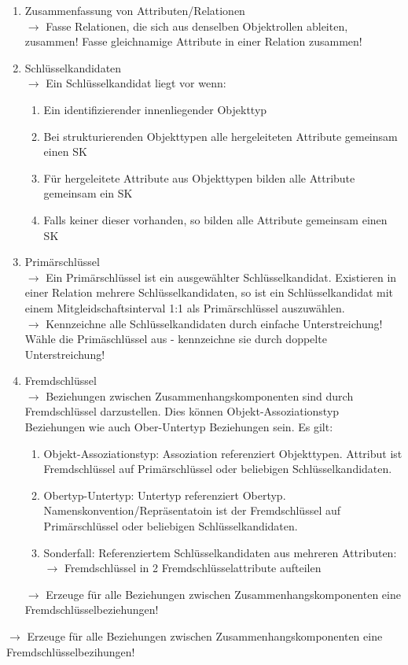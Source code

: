 \documentclass[a4paper,10pt]{scrartcl}
\begin{document}
\begin{enumerate}
    \item Zusammenfassung von Attributen/Relationen \\
    $\rightarrow$ Fasse Relationen, die sich aus denselben Objektrollen ableiten, zusammen! Fasse gleichnamige Attribute in einer Relation zusammen!
    
    \item Schlüsselkandidaten\\
    $\rightarrow$ Ein Schlüsselkandidat liegt vor wenn:
    \begin{enumerate}
        \item Ein identifizierender innenliegender Objekttyp
        \item Bei strukturierenden Objekttypen alle hergeleiteten Attribute gemeinsam einen SK
        \item Für hergeleitete Attribute aus Objekttypen bilden alle Attribute gemeinsam ein SK
        \item Falls keiner dieser vorhanden, so bilden alle Attribute gemeinsam einen SK
    \end{enumerate} 
    
    \item Primärschlüssel \\
    $\rightarrow$ 
    Ein Primärschlüssel ist ein ausgewählter Schlüsselkandidat. Existieren in einer Relation mehrere Schlüsselkandidaten, so ist ein Schlüsselkandidat mit einem Mitgleidschaftsinterval 1:1 als Primärschlüssel auszuwählen. \\
    $\rightarrow$ 
    Kennzeichne alle Schlüsselkandidaten durch einfache Unterstreichung! Wähle die Primäschlüssel aus - kennzeichne sie durch doppelte Unterstreichung!
    
    \item Fremdschlüssel \\
    $\rightarrow$ Beziehungen zwischen Zusammenhangskomponenten sind durch Fremdschlüssel darzustellen. Dies können Objekt-Assoziationstyp Beziehungen wie auch Ober-Untertyp Beziehungen sein. Es gilt:
    \begin{enumerate}
        \item Objekt-Assoziationstyp: Assoziation referenziert Objekttypen. Attribut ist Fremdschlüssel auf Primärschlüssel oder beliebigen Schlüsselkandidaten.
        \item Obertyp-Untertyp: Untertyp referenziert Obertyp. Namenskonvention/Repräsentatoin ist der Fremdschlüssel auf Primärschlüssel oder beliebigen Schlüsselkandidaten.
        \item Sonderfall: Referenziertem Schlüsselkandidaten aus mehreren Attributen:
        $\rightarrow$ Fremdschlüssel in 2 Fremdschlüsselattribute aufteilen
    \end{enumerate}
    $\rightarrow$ Erzeuge für alle Beziehungen zwischen Zusammenhangskomponenten eine Fremdschlüsselbeziehungen!
\end{enumerate}
$\rightarrow$ Erzeuge für alle Beziehungen zwischen Zusammenhangskomponenten eine Fremdschlüsselbezihungen!
\newpage
\end{document}
